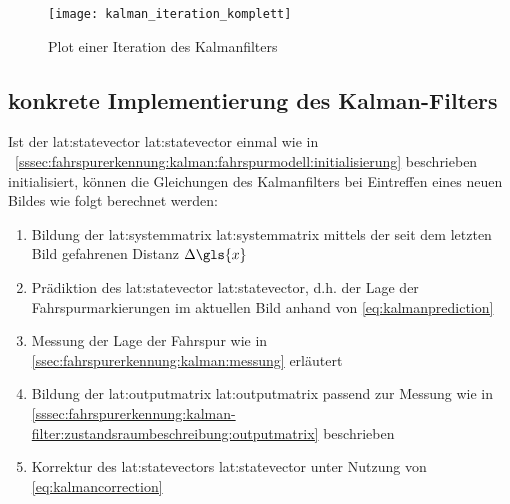 \begin{figure}[htb]
  \centering
  \texttt{[image: kalman\_iteration\_komplett]}
  \caption{Plot einer Iteration des Kalmanfilters}
  \label{fig:kalman:iteration_komplett}
\end{figure}

\subsection{konkrete Implementierung des Kalman-Filters}
Ist der \glsdesc{lat:statevector} \gls{lat:statevector} einmal wie in ~\ref{sssec:fahrspurerkennung:kalman:fahrspurmodell:initialisierung} beschrieben initialisiert, können die Gleichungen des Kalmanfilters bei Eintreffen eines neuen Bildes wie folgt berechnet werden:
\begin{enumerate}
\item Bildung der \glsdesc{lat:systemmatrix} \gls{lat:systemmatrix} mittels der seit dem letzten Bild gefahrenen Distanz \begin{math} \Delta \gls{x} \end{math}
\item Prädiktion des \glsdesc{lat:statevector} \gls{lat:statevector}, d.h. der Lage der Fahrspurmarkierungen im aktuellen Bild anhand von \eqref{eq:kalmanprediction}
\item Messung der Lage der Fahrspur wie in \ref{ssec:fahrspurerkennung:kalman:messung}
erläutert
\item Bildung der \glsdesc{lat:outputmatrix} \gls{lat:outputmatrix} passend zur Messung wie in \ref{sssec:fahrspurerkennung:kalman-filter:zustandsraumbeschreibung:outputmatrix} beschrieben
\item Korrektur des \glsdesc{lat:statevector}s \gls{lat:statevector} unter Nutzung von \eqref{eq:kalmancorrection}
\end{enumerate}




